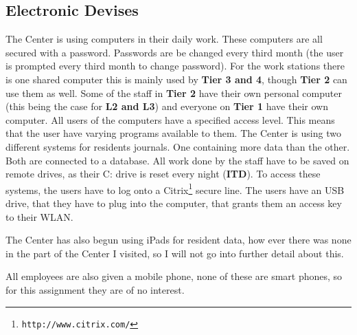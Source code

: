 \documentclass[11pt]{article}
\begin{document}
\subsection{Electronic Devises}
The Center is using computers in their daily work. These computers are all secured with a password. Passwords are be changed every third month (the user is prompted every third month to change password). For the work stations there is one shared computer this is mainly used by \textbf{Tier 3 and 4}, though \textbf{Tier 2} can use them as well. Some of the staff in \textbf{Tier 2} have their own personal computer (this being the case for \textbf{L2 and L3}) and everyone on \textbf{Tier 1} have their own computer. All users of the computers have a specified access level. This means that the user have varying programs available to them. The Center is using two different systems for residents journals. One containing more data than the other. Both are connected to a database. All work done by the staff have to be saved on remote drives, as their C: drive is reset every night (\textbf{ITD}). To access these systems, the users have to log onto a Citrix\footnote{\texttt{http://www.citrix.com/}} secure line. The users have an USB drive, that they have to plug into the computer, that grants them an access key to their WLAN.

The Center has also begun using iPads for resident data, how ever there was none in the part of the Center I visited, so I will not go into further detail about this.

All employees are also given a mobile phone, none of these are smart phones, so for this assignment they are of no interest.
\end{document}
